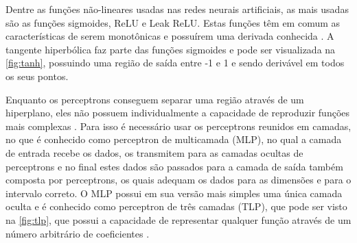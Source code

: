 Dentre as funções não-lineares usadas nas redes neurais artificiais, as mais usadas são as funções sigmoides, ReLU e Leak ReLU. Estas funções têm em comum as características de serem monotônicas e possuírem uma derivada conhecida \cite{Szandaa2020}. A tangente hiperbólica faz parte das funções sigmoides e pode ser visualizada na \autoref{fig:tanh}, possuindo uma região de saída entre -1 e 1 e sendo derivável em todos os seus pontos.

Enquanto os perceptrons conseguem separar uma região através de um hiperplano, eles não possuem individualmente a capacidade de reproduzir funções mais complexas \cite{haykin1999neural}. Para isso é necessário usar os perceptrons reunidos em camadas, no que é conhecido como perceptron de multicamada (MLP), no qual a camada de entrada recebe os dados, os transmitem para as camadas ocultas de perceptrons e no final estes dados são passados para a camada de saída também composta por perceptrons, os quais adequam os dados para as dimensões e para o intervalo correto. O MLP possui em sua versão mais simples uma única camada oculta e é conhecido como perceptron de três camadas (TLP), que pode ser visto na \autoref{fig:tlp}, que possui a capacidade de representar qualquer função através de um número arbitrário de coeficientes \cite{Hornik1991}.
\ExplSyntaxOn
{}
\ExplSyntaxOff
\def\layersep{2cm}
\storedata{}

